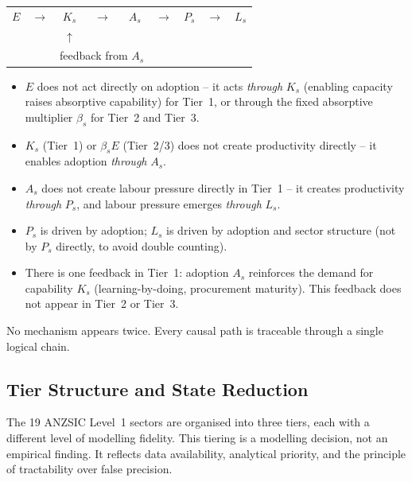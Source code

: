 \documentclass[11pt,a4paper]{article}
\begin{document}
\begin{center}
\begin{tabular}{ccccccccc}
$E$ & $\rightarrow$ & $K_s$ & $\rightarrow$ & $A_s$ & $\rightarrow$ & $P_s$ & $\rightarrow$ & $L_s$ \\
& & $\uparrow$ & & & & & & \\
& & \multicolumn{3}{c}{feedback from $A_s$} & & & &
\end{tabular}
\end{center}

\begin{itemize}
  \item $E$ does not act directly on adoption -- it acts \emph{through} $K_s$ (enabling capacity raises absorptive capability) for Tier~1, or through the fixed absorptive multiplier $\beta_s$ for Tier~2 and Tier~3.
  \item $K_s$ (Tier~1) or $\beta_s E$ (Tier~2/3) does not create productivity directly -- it enables adoption \emph{through} $A_s$.
  \item $A_s$ does not create labour pressure directly in Tier~1 -- it creates productivity \emph{through} $P_s$, and labour pressure emerges \emph{through} $L_s$.
  \item $P_s$ is driven by adoption; $L_s$ is driven by adoption and sector structure (not by $P_s$ directly, to avoid double counting).
  \item There is one feedback in Tier~1: adoption $A_s$ reinforces the demand for capability $K_s$ (learning-by-doing, procurement maturity). This feedback does not appear in Tier~2 or Tier~3.
\end{itemize}

No mechanism appears twice. Every causal path is traceable through a single logical chain.

\subsection{Tier Structure and State Reduction}
\label{sec:tiers}

The 19 ANZSIC Level~1 sectors are organised into three tiers, each with a different level of modelling fidelity. This tiering is a modelling decision, not an empirical finding. It reflects data availability, analytical priority, and the principle of tractability over false precision.
\end{document}
